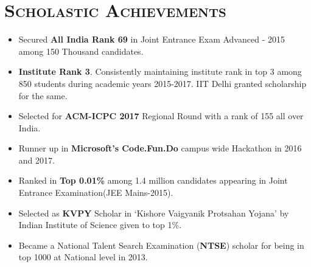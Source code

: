 \documentclass{article}
\newcommand{\tmpsection}[1]{}
\let\tmpsection=\section
\renewcommand{\section}[1]{\tmpsection*{\textsc{#1}}}
\begin{document}
\section{Scholastic Achievements}
\begin{itemize}
    \setlength\itemsep{0.0em}
    \item Secured \textbf{All India Rank 69} in Joint Entrance Exam Advanced - 2015 among 150 Thousand candidates.
    \item \textbf{Institute Rank 3}. Consistently maintaining institute rank in top 3 among 850 students during academic years 2015-2017. IIT Delhi granted scholarship for the same.
    \item Selected for \textbf{ACM-ICPC 2017} Regional Round with a rank of 155 all over India.
    \item Runner up in \textbf{Microsoft's Code.Fun.Do} campus wide Hackathon in 2016 and 2017.
    \item Ranked in \textbf{Top 0.01\%} among 1.4 million candidates appearing in Joint Entrance Examination(JEE Mains-2015).
    \item Selected as \textbf{KVPY} Scholar in `Kishore Vaigyanik Protsahan Yojana' by Indian Institute of Science given to top 1\%.
    \item Became a National Talent Search Examination (\textbf{NTSE}) scholar for being in top 1000 at National level in 2013.
\end{itemize}
\end{document}
